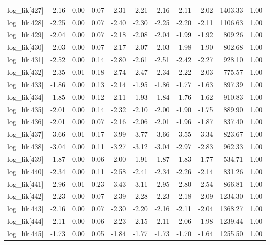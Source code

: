 \begin{table}[ht]
\begin{tabular}{rrrrrrrrrrr}
  log\_lik[427] & -2.16 & 0.00 & 0.07 & -2.31 & -2.21 & -2.16 & -2.11 & -2.02 & 1403.33 & 1.00 \\ 
  log\_lik[428] & -2.25 & 0.00 & 0.07 & -2.40 & -2.30 & -2.25 & -2.20 & -2.11 & 1106.63 & 1.00 \\ 
  log\_lik[429] & -2.04 & 0.00 & 0.07 & -2.18 & -2.08 & -2.04 & -1.99 & -1.92 & 809.26 & 1.00 \\ 
  log\_lik[430] & -2.03 & 0.00 & 0.07 & -2.17 & -2.07 & -2.03 & -1.98 & -1.90 & 802.68 & 1.00 \\ 
  log\_lik[431] & -2.52 & 0.00 & 0.14 & -2.80 & -2.61 & -2.51 & -2.42 & -2.27 & 928.10 & 1.00 \\ 
  log\_lik[432] & -2.35 & 0.01 & 0.18 & -2.74 & -2.47 & -2.34 & -2.22 & -2.03 & 775.57 & 1.00 \\ 
  log\_lik[433] & -1.86 & 0.00 & 0.13 & -2.14 & -1.95 & -1.86 & -1.77 & -1.63 & 897.39 & 1.00 \\ 
  log\_lik[434] & -1.85 & 0.00 & 0.12 & -2.11 & -1.93 & -1.84 & -1.76 & -1.62 & 910.83 & 1.00 \\ 
  log\_lik[435] & -2.01 & 0.00 & 0.14 & -2.32 & -2.10 & -2.00 & -1.90 & -1.75 & 889.90 & 1.00 \\ 
  log\_lik[436] & -2.01 & 0.00 & 0.07 & -2.16 & -2.06 & -2.01 & -1.96 & -1.87 & 837.40 & 1.00 \\ 
  log\_lik[437] & -3.66 & 0.01 & 0.17 & -3.99 & -3.77 & -3.66 & -3.55 & -3.34 & 823.67 & 1.00 \\ 
  log\_lik[438] & -3.04 & 0.00 & 0.11 & -3.27 & -3.12 & -3.04 & -2.97 & -2.83 & 962.33 & 1.00 \\ 
  log\_lik[439] & -1.87 & 0.00 & 0.06 & -2.00 & -1.91 & -1.87 & -1.83 & -1.77 & 534.71 & 1.00 \\ 
  log\_lik[440] & -2.34 & 0.00 & 0.11 & -2.58 & -2.41 & -2.34 & -2.26 & -2.14 & 831.26 & 1.00 \\ 
  log\_lik[441] & -2.96 & 0.01 & 0.23 & -3.43 & -3.11 & -2.95 & -2.80 & -2.54 & 866.81 & 1.00 \\ 
  log\_lik[442] & -2.23 & 0.00 & 0.07 & -2.39 & -2.28 & -2.23 & -2.18 & -2.09 & 1234.30 & 1.00 \\ 
  log\_lik[443] & -2.16 & 0.00 & 0.07 & -2.30 & -2.20 & -2.16 & -2.11 & -2.04 & 1368.27 & 1.00 \\ 
  log\_lik[444] & -2.11 & 0.00 & 0.06 & -2.23 & -2.15 & -2.11 & -2.06 & -1.98 & 1239.44 & 1.00 \\ 
  log\_lik[445] & -1.73 & 0.00 & 0.05 & -1.84 & -1.77 & -1.73 & -1.70 & -1.64 & 1255.50 & 1.00 \\ 

\end{tabular}
\end{table}
